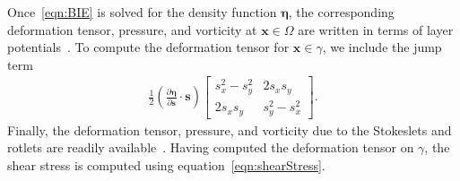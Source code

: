 \documentclass[3p]{elsarticle}
\newcommand{\eeta}{{\boldsymbol\eta}}
\renewcommand{\ss}{{\mathbf{s}}}
\newcommand{\xx}{{\mathbf{x}}}
\newcommand{\pderiv}[2]{\frac{\partial #1}{\partial #2}}
\begin{document}
Once~\eqref{eqn:BIE} is solved for the density function $\eeta$, the
corresponding deformation tensor, pressure, and vorticity at $\xx \in
\Omega$ are written in terms of layer potentials~\citep{qua-moo2018}.
To compute the deformation tensor for $\xx \in \gamma$, we include the
jump term
\begin{align}
  \frac{1}{2} \left(\pderiv{\eeta}{\ss} \cdot \ss \right) \left[
    \begin{array}{cc}
      s_x^2 - s_y^2 & 2s_x s_y \\ 2s_x s_y & s_y^2 - s_x^2
    \end{array}
  \right].
  \label{eqn:deformationJump}
\end{align}
Finally, the deformation tensor, pressure, and vorticity due to the
Stokeslets and rotlets are readily available~\citep{poz1992}. Having
computed the deformation tensor on $\gamma$, the shear stress is
computed using equation~\eqref{eqn:shearStress}. 

\end{document}

